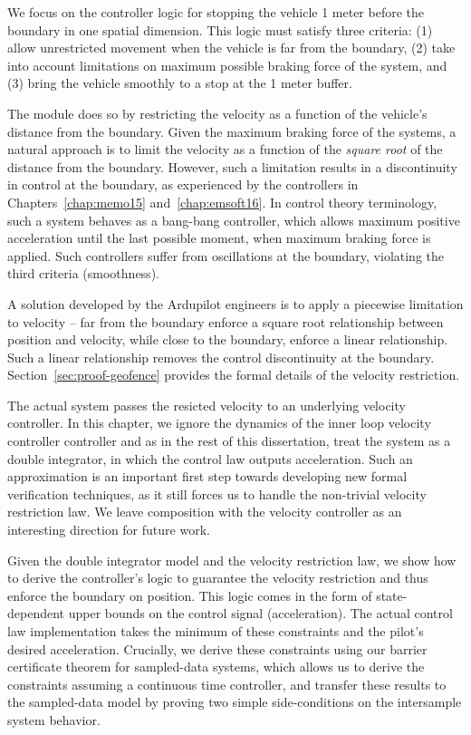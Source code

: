 We focus on the controller logic for stopping the vehicle 1 meter before
the boundary in one spatial dimension. This logic must satisfy three
criteria: (1) allow unrestricted movement when the vehicle is far from the
boundary, (2) take into account limitations on maximum possible braking
force of the system, and (3) bring the vehicle smoothly to a stop at the 1
meter buffer.

The module does so by restricting the velocity as a function of the
vehicle's distance from the boundary. Given the maximum braking force of
the systems, a natural approach is to limit the velocity as a function of
the \emph{square root} of the distance from the boundary. However, such a
limitation results in a discontinuity in control at the boundary, as
experienced by the controllers in Chapters~\ref{chap:memo15}
and~\ref{chap:emsoft16}. In control theory terminology, such a system
behaves as a bang-bang controller, which allows maximum positive
acceleration until the last possible moment, when maximum braking force is
applied. Such controllers suffer from oscillations at the boundary,
violating the third criteria (smoothness).

A solution developed by the Ardupilot engineers is to apply a piecewise
limitation to velocity -- far from the boundary enforce a square root
relationship between position and velocity, while close to the boundary,
enforce a linear relationship. Such a linear relationship removes the
control discontinuity at the boundary. Section~\ref{sec:proof-geofence}
provides the formal details of the velocity restriction.

The actual system passes the resicted velocity to an underlying velocity
controller. In this chapter, we ignore the dynamics of the inner loop
velocity controller controller and as in the rest of this dissertation,
treat the system as a double integrator, in which the control law outputs
acceleration. Such an approximation is an important first step towards
developing new formal verification techniques, as it still forces us to
handle the non-trivial velocity restriction law.  We leave composition with
the velocity controller as an interesting direction for future work.

Given the double integrator model and the velocity restriction law, we show
how to derive the controller's logic to guarantee the velocity restriction
and thus enforce the boundary on position. This logic comes in the form of
state-dependent upper bounds on the control signal (acceleration). The
actual control law implementation takes the minimum of these constraints
and the pilot's desired acceleration. Crucially, we derive these
constraints using our barrier certificate theorem for sampled-data systems,
which allows us to derive the constraints assuming a continuous time
controller, and transfer these results to the sampled-data model by proving
two simple side-conditions on the intersample system behavior.

